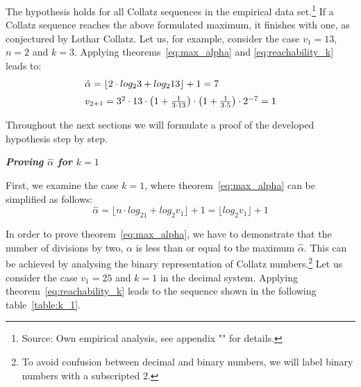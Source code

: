 \documentclass{SciPress_2015}
\renewcommand{\subsection}[1]{\textit{\textbf{#1}}}
\begin{document}
The hypothesis holds for all Collatz sequences in the empirical data set.\footnote{Source: Own empirical analysis, see appendix "" for details.} If a Collatz sequence reaches the above formulated maximum, it finishes with one, as conjectured by Lothar Collatz. Let us, for example, consider the case $v_1=13$, $n=2$ and $k=3$. Applying theorems~\ref{eq:max_alpha} and \ref{eq:reachability_k} leads to:
\[
\begin{array}{l}
\hat\alpha=\lfloor 2\cdot log_23+log_213\rfloor+1=7\\[\medskipamount]
v_{2+1}=3^2\cdot 13\cdot\left(1+\frac{1}{3\cdot13}\right)\cdot\left(1+\frac{1}{3\cdot5}\right)\cdot2^{-7}=1
\end{array}
\]

\par\noindent
Throughout the next sections we will formulate a proof of the developed hypothesis step by step.

\vspace{1em}\noindent
\subsection{Proving \boldmath$\hat\alpha$ for \boldmath$k=1$}
\par\noindent
First, we examine the case $k=1$, where theorem~\ref{eq:max_alpha} can be simplified as follows:
\begin{equation}
\label{eq:max_alpha_1}
\hat\alpha=\lfloor n\cdot log_21+log_2v_1\rfloor+1=\lfloor log_2v_1\rfloor+1
\end{equation}

\par\noindent
In order to prove theorem~\ref{eq:max_alpha}, we have to demonstrate that the number of divisions by two, $\alpha$ is less than or equal to the maximum $\hat\alpha$. This can be achieved by analysing the binary representation of Collatz numbers.\footnote{To avoid confusion between decimal and binary numbers, we will label binary numbers with a subscripted $2$.} Let us consider the case $v_1=25$ and $k=1$ in the decimal system. Applying theorem~\ref{eq:reachability_k} leads to the sequence shown in the following table~\ref{table:k_1}.
\end{document}
